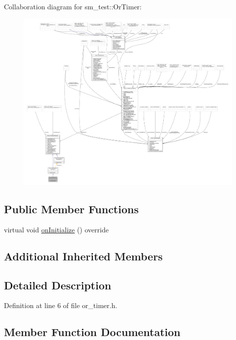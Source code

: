 Collaboration diagram for sm\+\_\+test\+:\+:Or\+Timer\+:
\nopagebreak
\begin{figure}[H]
\begin{center}
\leavevmode
\includegraphics[width=350pt]{classsm__test_1_1OrTimer__coll__graph}
\end{center}
\end{figure}
\subsection*{Public Member Functions}
\begin{DoxyCompactItemize}
\item 
virtual void \hyperlink{classsm__test_1_1OrTimer_ae37eaf4bcf75d7108a69e4f4bf257f32}{on\+Initialize} () override
\end{DoxyCompactItemize}
\subsection*{Additional Inherited Members}


\subsection{Detailed Description}


Definition at line 6 of file or\+\_\+timer.\+h.



\subsection{Member Function Documentation}
\mbox{\label{classsm__test_1_1OrTimer_ae37eaf4bcf75d7108a69e4f4bf257f32}} 

